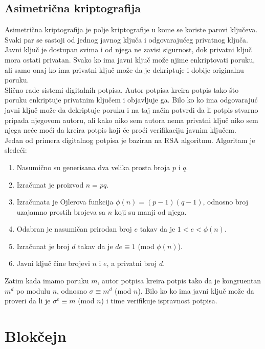 \documentclass[a4paper]{article}
\begin{document}
{\subsection{Asimetrična kriptografija}
Asimetrična kriptografija je polje kriptografije u kome se koriste parovi ključeva. Svaki par se sastoji od jednog javnog ključa i odgovarajućeg privatnog ključa. Javni ključ je dostupan svima i od njega ne zavisi sigurnost, dok privatni ključ mora ostati privatan. Svako ko ima javni ključ može njime enkriptovati poruku, ali samo onaj ko ima privatni ključ može da je dekriptuje i dobije originalnu poruku. \\
Slično rade sistemi digitalnih potpisa. Autor potpisa kreira potpis tako što poruku enkriptuje privatnim ključem i objavljuje ga. Bilo ko ko ima odgovarajuć javni ključ može da dekriptuje poruku i na taj način potvrdi da li potpis stvarno pripada njegovom autoru, ali kako niko sem autora nema privatni ključ niko sem njega neće moći da kreira potpis koji će proći verifikaciju javnim ključem. \\
Jedan od primera digitalnog potpisa je baziran na RSA algoritmu. Algoritam je sledeći:
\begin{enumerate}   
    \item Nasumično su generisana dva velika prosta broja $p$ i $q$.
    \item Izračunat je proizvod $n = pq$.
    \item Izračunata je Ojlerova funkcija $\phi(n)=(p - 1)(q - 1)$, odnosno broj uzajamno prostih brojeva sa $n$ koji su manji od njega.
    \item  Odabran je nasumičan prirodan broj $e$ takav da je $1 < e < \phi(n)$.
    \item Izračunat je broj $d$ takav da je $de \equiv 1$ (mod $\phi(n)$).
    \item Javni ključ čine brojevi $n$ i $e$, a privatni broj $d$. \\
\end{enumerate}
Zatim kada imamo poruku $m$, autor potpisa kreira potpis tako da je kongruentan $m^{d}$ po modulu $n$, odnosno $\sigma \equiv m^{d}$ (mod $n$). Bilo ko ko ima javni ključ može da proveri da li je  ${\sigma}^{e} \equiv m$ (mod $n$) i time verifikuje ispravnost potpisa.


\section{Blokčejn}
\label{sec:blockchain}

}
\end{document}
